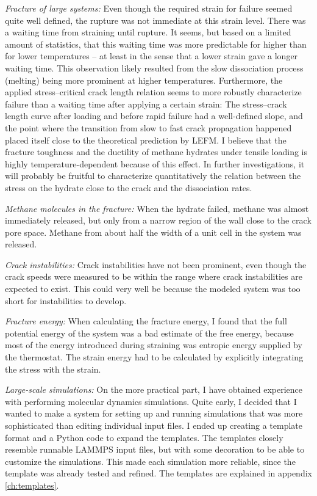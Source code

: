 \textit{Fracture of large systems:} Even though the required strain for failure seemed quite well defined, the rupture was not immediate at this strain level. There was a waiting time from straining until rupture. It seems, but based on a limited amount of statistics, that this waiting time was more predictable for higher than for lower temperatures -- at least in the sense that a lower strain gave a longer waiting time. This observation likely resulted from the slow dissociation process (melting) being more prominent at higher temperatures.  Furthermore, the applied stress--critical crack length relation seems to more robustly characterize failure than a waiting time after applying a certain strain: The stress--crack length curve after loading and before rapid failure had a well-defined slope, and the point where the transition from slow to fast crack propagation happened placed itself close to the theoretical prediction by LEFM. I believe that the fracture toughness and the ductility of methane hydrates under tensile loading is highly temperature-dependent because of this effect. In further investigations, it will probably be fruitful to characterize quantitatively the relation between the stress on the hydrate close to the crack and the dissociation rates. 

\textit{Methane molecules in the fracture:} When the hydrate failed, methane was almost immediately released, but only from a narrow region of the wall close to the crack pore space. Methane from about half the width of a unit cell in the system was released.

\textit{Crack instabilities:} Crack instabilities have not been prominent, even though the crack speeds were measured to be within the range where crack instabilities are expected to exist. This could very well be because the modeled system was too short for instabilities to develop.

\textit{Fracture energy:} When calculating the fracture energy, I found that the full potential energy of the system was a bad estimate of the free energy, because most of the energy introduced during straining was entropic energy supplied by the thermostat. The strain energy had to be calculated by explicitly integrating the stress with the strain. 

\textit{Large-scale simulations:} On the more practical part, I have obtained experience with performing molecular dynamics simulations. Quite early, I decided that I wanted to make a system for setting up and running simulations that was more sophisticated than editing individual input files. I ended up creating a template format and a Python code to expand the templates. The templates closely resemble runnable LAMMPS input files, but with some decoration to be able to customize the simulations. This made each simulation more reliable, since the template was already tested and refined. The templates are explained in appendix \ref{ch:templates}.


